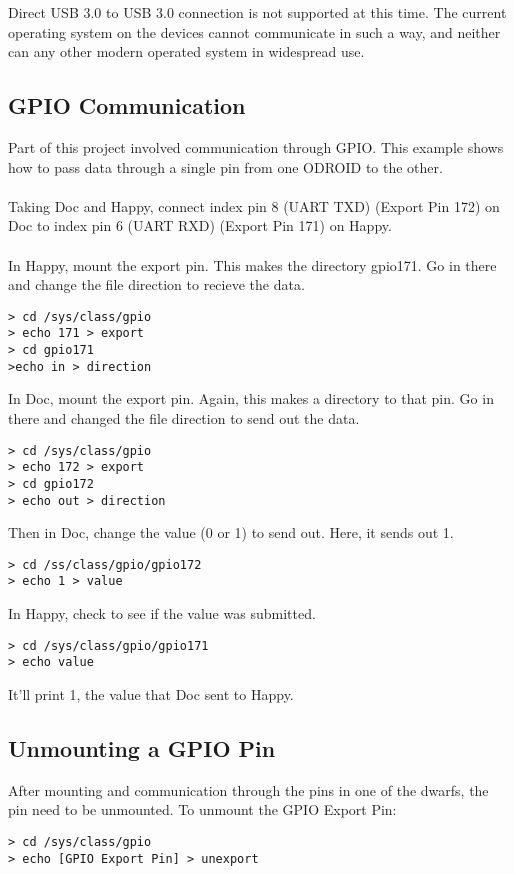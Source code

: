 Direct USB 3.0 to USB 3.0 connection is not supported at this time. The current operating system on the devices cannot communicate in such a way, and neither can any other modern operated system in widespread use. 

\subsection{GPIO Communication}
Part of this project involved communication through GPIO. This example shows how to pass data through a single pin from one ODROID to the other. \\ \\
Taking Doc and Happy, connect index pin 8 (UART TXD) (Export Pin 172) on Doc to index pin 6 (UART RXD) (Export Pin 171) on Happy. \\ \\
In Happy, mount the export pin. This makes the directory gpio171. Go in there and change the file direction to recieve the data.
\begin{lstlisting}
> cd /sys/class/gpio
> echo 171 > export
> cd gpio171
>echo in > direction
\end{lstlisting}
In Doc, mount the export pin. Again, this makes a directory to that pin. Go in there and changed the file direction to send out the data.
\begin{lstlisting}
> cd /sys/class/gpio 
> echo 172 > export 
> cd gpio172 
> echo out > direction
\end{lstlisting}
Then in Doc, change the value (0 or 1) to send out. Here, it sends out 1.
\begin{lstlisting}
> cd /ss/class/gpio/gpio172
> echo 1 > value
\end{lstlisting}
In Happy, check to see if the value was submitted.
\begin{lstlisting}
> cd /sys/class/gpio/gpio171
> echo value
\end{lstlisting}
It'll print 1, the value that Doc sent to Happy.

\subsection{Unmounting a GPIO Pin}
After mounting and communication through the pins in one of the dwarfs, the pin need to be unmounted. To unmount the GPIO Export Pin:
\begin{lstlisting}
> cd /sys/class/gpio
> echo [GPIO Export Pin] > unexport
\end{lstlisting}

